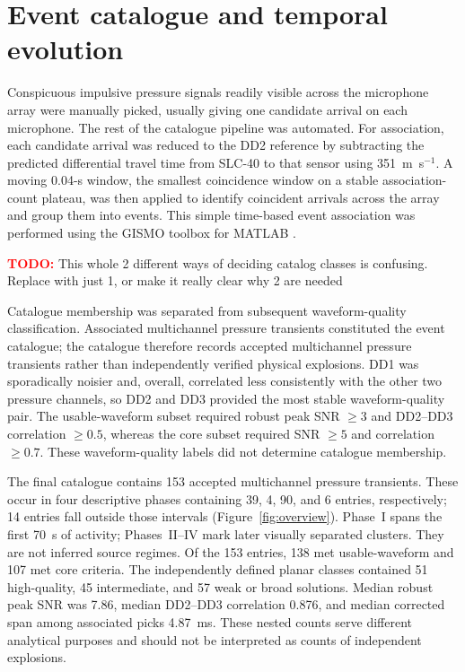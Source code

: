 \documentclass[]{seismica}
\newcommand{\todo}[1]{%
  \par\noindent
  \colorbox{yellow!40}{%
    \parbox{0.96\linewidth}{%
      \textbf{\textcolor{red}{TODO:}} #1
    }%
  }%
  \par
}
\begin{document}
\section{Event catalogue and temporal evolution}
\label{sec:temporal_evolution}

Conspicuous impulsive pressure signals readily visible across the microphone
array were manually picked, usually giving one candidate arrival on each
microphone. The rest of the catalogue pipeline was automated. For association,
each candidate arrival was reduced to the DD2 reference by subtracting the
predicted differential travel time from SLC-40 to that sensor using
351~m~s$^{-1}$. A moving 0.04-s window, the smallest coincidence window on a
stable association-count plateau, was then applied to identify coincident
arrivals across the array and group them into events. This simple time-based
event association was performed using the GISMO toolbox for MATLAB 
\citep{thompson_gismo_2017}.

\todo{This whole 2 different ways of deciding catalog classes is confusing.
Replace with just 1, or make it really clear why 2 are needed}
Catalogue membership was separated from subsequent waveform-quality
classification. Associated multichannel pressure transients constituted the
event catalogue; the catalogue therefore records accepted multichannel
pressure transients rather than independently verified physical explosions.
DD1 was sporadically noisier and, overall, correlated less consistently with
the other two pressure channels, so DD2 and DD3 provided the most stable
waveform-quality pair. The usable-waveform subset required robust peak
SNR $\geq3$ and DD2--DD3 correlation $\geq0.5$, whereas the core subset
required SNR $\geq5$ and correlation $\geq0.7$. These waveform-quality labels
did not determine catalogue membership.

The final catalogue contains 153 accepted multichannel pressure transients.
These occur in four descriptive phases containing 39, 4, 90, and 6 entries,
respectively; 14 entries fall outside those intervals
(Figure~\ref{fig:overview}). Phase~I spans the first 70~s of activity;
Phases~II--IV mark later visually separated clusters. They are not inferred
source regimes. Of the 153 entries, 138 met usable-waveform and 107 met core
criteria. The independently defined planar classes contained 51 high-quality,
45 intermediate, and 57 weak or broad solutions. Median robust peak SNR was
7.86, median DD2--DD3 correlation 0.876, and median corrected span among
associated picks 4.87~ms. These nested counts serve different analytical
purposes and should not be interpreted as counts of independent explosions.
\end{document}

